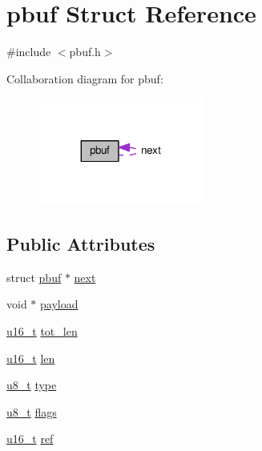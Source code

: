 \hypertarget{structpbuf}{}\section{pbuf Struct Reference}
\label{structpbuf}


{\ttfamily \#include $<$pbuf.\+h$>$}



Collaboration diagram for pbuf\+:
\nopagebreak
\begin{figure}[H]
\begin{center}
\leavevmode
\includegraphics[width=155pt]{structpbuf__coll__graph}
\end{center}
\end{figure}
\subsection*{Public Attributes}
\begin{DoxyCompactItemize}
\item 
struct \hyperlink{structpbuf}{pbuf} $\ast$ \hyperlink{structpbuf_a41ea0f0854e54c5b8492aebf096b9247}{next}
\item 
void $\ast$ \hyperlink{structpbuf_a11fb0edc141d71761d1f928c63c72c7e}{payload}
\item 
\hyperlink{group__compiler__abstraction_ga77570ac4fcab86864fa1916e55676da2}{u16\+\_\+t} \hyperlink{structpbuf_a5259e7ec29bab9c0999b64f2e86b411f}{tot\+\_\+len}
\item 
\hyperlink{group__compiler__abstraction_ga77570ac4fcab86864fa1916e55676da2}{u16\+\_\+t} \hyperlink{structpbuf_a6f82449625e36e294f5d210268c0703f}{len}
\item 
\hyperlink{group__compiler__abstraction_ga4caecabca98b43919dd11be1c0d4cd8e}{u8\+\_\+t} \hyperlink{structpbuf_afd7bff5210a022424caa97d2f25fe8e6}{type}
\item 
\hyperlink{group__compiler__abstraction_ga4caecabca98b43919dd11be1c0d4cd8e}{u8\+\_\+t} \hyperlink{structpbuf_aa4d1af2cab3d9280d29212095b5b872a}{flags}
\item 
\hyperlink{group__compiler__abstraction_ga77570ac4fcab86864fa1916e55676da2}{u16\+\_\+t} \hyperlink{structpbuf_a18e2c02942feb1baa3756fcd585b6731}{ref}
\end{DoxyCompactItemize}


